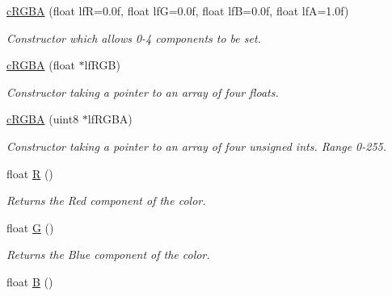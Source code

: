 \begin{DoxyCompactItemize}
\item 
\hypertarget{classc_r_g_b_a_a29ab987874e4fee0e66aa13bfa17a354}{
\hyperlink{classc_r_g_b_a_a29ab987874e4fee0e66aa13bfa17a354}{cRGBA} (float lfR=0.0f, float lfG=0.0f, float lfB=0.0f, float lfA=1.0f)}
\label{classc_r_g_b_a_a29ab987874e4fee0e66aa13bfa17a354}

\begin{DoxyCompactList}\small\item\em Constructor which allows 0-\/4 components to be set. \end{DoxyCompactList}\item 
\hypertarget{classc_r_g_b_a_a4df387999bb45a92c1ac4ec39585e58c}{
\hyperlink{classc_r_g_b_a_a4df387999bb45a92c1ac4ec39585e58c}{cRGBA} (float $\ast$lfRGB)}
\label{classc_r_g_b_a_a4df387999bb45a92c1ac4ec39585e58c}

\begin{DoxyCompactList}\small\item\em Constructor taking a pointer to an array of four floats. \end{DoxyCompactList}\item 
\hypertarget{classc_r_g_b_a_a36327b799646b680400cace8d0bd8c91}{
\hyperlink{classc_r_g_b_a_a36327b799646b680400cace8d0bd8c91}{cRGBA} (uint8 $\ast$lfRGBA)}
\label{classc_r_g_b_a_a36327b799646b680400cace8d0bd8c91}

\begin{DoxyCompactList}\small\item\em Constructor taking a pointer to an array of four unsigned ints. Range 0-\/255. \end{DoxyCompactList}\item 
\hypertarget{classc_r_g_b_a_a4e9071d7007764db7114a2841608c7d9}{
float \hyperlink{classc_r_g_b_a_a4e9071d7007764db7114a2841608c7d9}{R} ()}
\label{classc_r_g_b_a_a4e9071d7007764db7114a2841608c7d9}

\begin{DoxyCompactList}\small\item\em Returns the Red component of the color. \end{DoxyCompactList}\item 
\hypertarget{classc_r_g_b_a_ad475dab144bb13a5ae4f39263783f357}{
float \hyperlink{classc_r_g_b_a_ad475dab144bb13a5ae4f39263783f357}{G} ()}
\label{classc_r_g_b_a_ad475dab144bb13a5ae4f39263783f357}

\begin{DoxyCompactList}\small\item\em Returns the Blue component of the color. \end{DoxyCompactList}\item 
\hypertarget{classc_r_g_b_a_aa2083970f51969b73f0d17ff3cbb64fa}{
float \hyperlink{classc_r_g_b_a_aa2083970f51969b73f0d17ff3cbb64fa}{B} ()}
\label{classc_r_g_b_a_aa2083970f51969b73f0d17ff3cbb64fa}


\end{DoxyCompactItemize}
